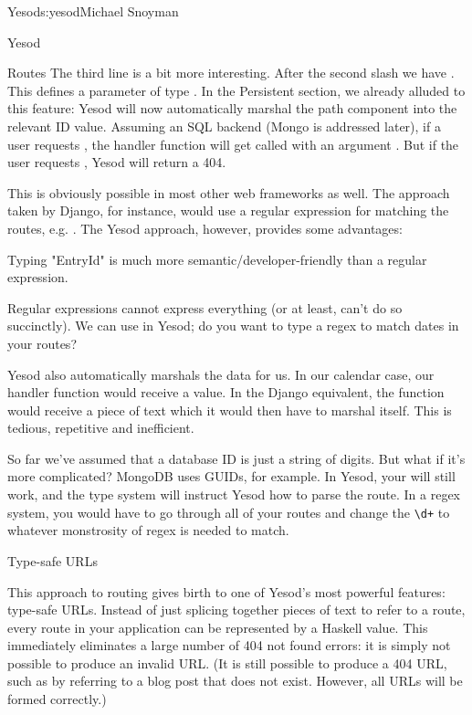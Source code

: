 \begin{aosachapter}{Yesod}{s:yesod}{Michael Snoyman}
\begin{aosasect1}{Yesod}
\begin{aosasect2}{Routes}
The third line is a bit more interesting. After the second slash we
have . This defines a parameter of type
. In the Persistent section, we already alluded to this
feature: Yesod will now automatically marshal the path component into
the relevant ID value. Assuming an SQL backend (Mongo is addressed
later), if a user requests , the handler function will
get called with an argument . But if the user requests
, Yesod will return a 404.

This is obviously possible in most other web frameworks as well. The
approach taken by Django, for instance, would use a regular expression
for matching the routes, e.g. . The Yesod
approach, however, provides some advantages:

\begin{aosaitemize}

\item Typing "EntryId" is much more semantic/developer-friendly than a
  regular expression.

\item Regular expressions cannot express everything (or at least,
  can't do so succinctly). We can use  in Yesod;
  do you want to type a regex to match dates in your routes?

\item Yesod also automatically marshals the data for us. In our
  calendar case, our handler function would receive a 
  value. In the Django equivalent, the function would receive a piece
  of text which it would then have to marshal itself. This is tedious,
  repetitive and inefficient.

\item So far we've assumed that a database ID is just a string of
  digits. But what if it's more complicated? MongoDB uses GUIDs, for
  example. In Yesod, your  will still work, and the type
  system will instruct Yesod how to parse the route. In a regex
  system, you would have to go through all of your routes and change
  the \verb=\d+= to whatever monstrosity of regex is needed to match.

\end{aosaitemize}

\begin{aosasect3}{Type-safe URLs}

This approach to routing gives birth to one of Yesod's most powerful
features: type-safe URLs. Instead of just splicing together pieces of
text to refer to a route, every route in your application can be
represented by a Haskell value. This immediately eliminates a large
number of 404 not found errors: it is simply not possible to produce
an invalid URL.  (It is still possible to produce a 404 URL, such as
by referring to a blog post that does not exist. However, all URLs
will be formed correctly.)


\end{aosasect3}
\end{aosasect2}
\end{aosasect1}
\end{aosachapter}
